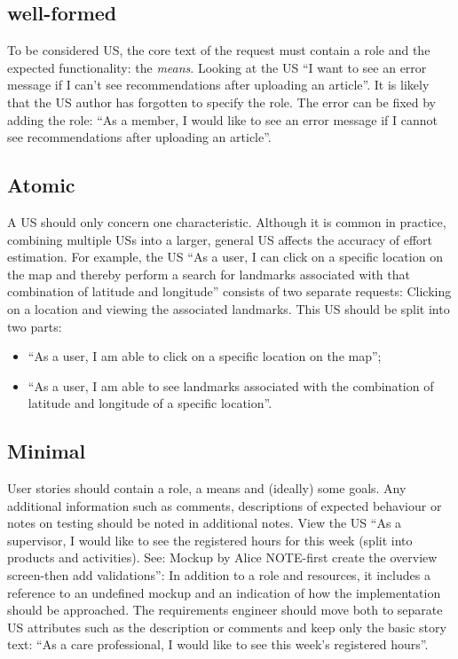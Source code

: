 \subsection*{\normalsize{well-formed}}
To be considered US, the core text of the request must contain a role and the expected functionality: the \emph{means}. Looking at the US \enquote{I want to see an error message if I can't see recommendations after uploading an article}. It is likely that the US author has forgotten to specify the role. The error can be fixed by adding the role: \enquote{As a member, I would like to see an error message if I cannot see recommendations after uploading an article}.
\subsection*{\normalsize{Atomic}}
A US should only concern one characteristic. Although it is common in practice, combining multiple USs into a larger, general US affects the accuracy of effort estimation\cite{liskin2014we}. For example, the US \enquote{As a user, I can click on a specific location on the map and thereby perform a search for landmarks associated with that combination of latitude and longitude} consists of two separate requests: Clicking on a location and viewing the associated landmarks. This US should be split into two parts:
\begin{itemize}
\item  \enquote{As a user, I am able to click on a specific location on the map};
\item  \enquote{As a user, I am able to see landmarks associated with the combination of latitude and longitude of a specific location}.
\end{itemize}
\subsection*{\normalsize{Minimal}}
User stories should contain a role, a means and (ideally) some goals. Any additional information such as comments, descriptions of expected behaviour or notes on testing should be noted in additional notes. View the US \enquote{As a supervisor, I would like to see the registered hours for this week (split into products and activities). See: Mockup by Alice NOTE-first create the overview screen-then add validations}: In addition to a role and resources, it includes a reference to an undefined mockup and an indication of how the implementation should be approached. The requirements engineer should move both to separate US attributes such as the description or comments and keep only the basic story text: \enquote{As a care professional, I would like to see this week's registered hours}.
